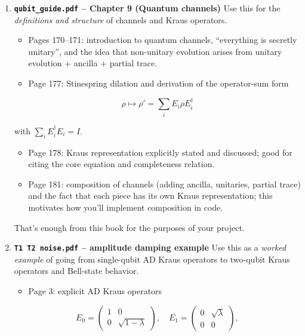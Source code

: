 \documentclass[11pt]{article}
\begin{document}
\begin{enumerate}
\item \textbf{\texttt{qubit\_guide.pdf} -- Chapter 9 (Quantum channels)}  
   Use this for the \textit{definitions and structure} of channels and Kraus operators.

\begin{itemize}
\item Pages 170--171: introduction to quantum channels, ``everything is secretly unitary'', and the idea that non-unitary evolution arises from unitary evolution + ancilla + partial trace.
\item Page 177: Stinespring dilation and derivation of the operator-sum form
\end{itemize}
     
\begin{equation}
\rho \mapsto \rho' = \sum_i E_i \rho E_i^\dagger
\end{equation}

     with $\sum_i E_i^\dagger E_i = I$.
\begin{itemize}
\item Page 178: Kraus representation explicitly stated and discussed; good for citing the core equation and completeness relation.
\item Page 181: composition of channels (adding ancilla, unitaries, partial trace) and the fact that each piece has its own Kraus representation; this motivates how you'll implement composition in code.
\end{itemize}

   That's enough from this book for the purposes of your project.

\item \textbf{\texttt{T1 T2 noise.pdf} -- amplitude damping example}  
   Use this as a \textit{worked example} of going from single-qubit AD Kraus operators to two-qubit Kraus operators and Bell-state behavior.

\begin{itemize}
\item Page 3: explicit AD Kraus operators
\end{itemize}
     
\begin{equation}
E_0 = \begin{pmatrix} 1 & 0 \\ 0 & \sqrt{1-\lambda} \end{pmatrix},\quad
     E_1 = \begin{pmatrix} 0 & \sqrt{\lambda} \\ 0 & 0 \end{pmatrix},
\end{equation}


\end{enumerate}
\end{document}

